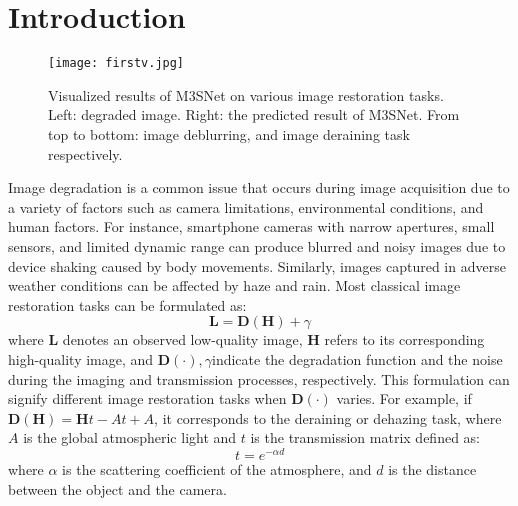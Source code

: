 \documentclass[sn-mathphys,Numbered]{sn-jnl}
\theoremstyle{thmstyleone}\newtheorem{theorem}{Theorem}\newtheorem{proposition}[theorem]{Proposition}
\theoremstyle{thmstyletwo}\newtheorem{example}{Example}\newtheorem{remark}{Remark}
\theoremstyle{thmstylethree}\newtheorem{definition}{Definition}
\begin{document}
\maketitle

\section{Introduction}\label{sec1}
\begin{figure}[b] \centering
	\texttt{[image: firstv.jpg]}
	\caption{Visualized results of M3SNet on various image
restoration tasks. Left: degraded image. Right: the predicted result of M3SNet. From top to bottom: image deblurring, and image deraining task respectively.}
	\label{fig:001}
\end{figure}
Image degradation is a common issue that occurs during image acquisition due to a variety of factors such as camera limitations, environmental conditions, and human factors. For instance, smartphone cameras with narrow apertures, small sensors, and limited dynamic range can produce blurred and noisy images due to device shaking caused by body movements. Similarly, images captured in adverse weather conditions can be affected by haze and rain.  Most classical image restoration tasks can be formulated as:
\begin{equation}
	\label{equ:001}
	\mathbf{L} = \mathbf{D}(\mathbf{H}) + \gamma
\end{equation}
where $\mathbf{L}$ denotes an observed low-quality image, $\mathbf{H}$ refers to its corresponding high-quality image, and $\mathbf{D}(\cdot), \gamma $indicate the degradation function and the noise during the imaging and transmission processes, respectively. This formulation can signify different image restoration tasks when $\mathbf{D}(\cdot)$ varies. For example, if $\mathbf{D(H)} = \mathbf{H}t - At + A$, it corresponds to the deraining or dehazing task, where $A$ is the global atmospheric light and $t$ is the transmission matrix defined as:
\begin{equation}
	\label{equ:002}
	t = e^{-\alpha d}
\end{equation}
where $\alpha$ is the scattering coefficient of the atmosphere, and $d$ is the distance between the object and the camera.
\end{document}
